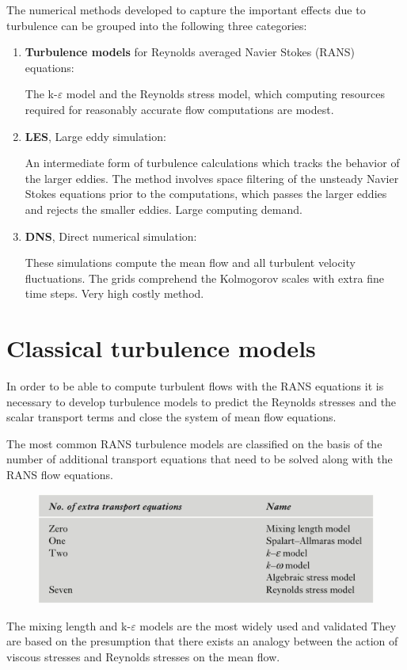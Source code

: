 \documentclass[a4paper, 15pt]{article}
\begin{document}
The
numerical methods developed to capture the important effects due to turbulence can be
grouped into the following three categories:
\begin{enumerate}
	\item \textbf{Turbulence models} for Reynolds averaged Navier Stokes (RANS) equations:
	
	The k-$\varepsilon$ model and the Reynolds stress model, which computing
	resources required for reasonably accurate flow computations are modest.
	
	\item \textbf{LES}, Large eddy simulation: 
	
	An intermediate form of turbulence calculations which tracks
	the behavior of the larger eddies. The method involves space filtering of the unsteady
	Navier Stokes equations prior to the computations, which passes the larger eddies and rejects
	the smaller eddies. 
	Large computing demand. 
	
	\item \textbf{DNS}, Direct numerical simulation:
	
	These simulations compute the mean flow and all
	turbulent velocity fluctuations. The grids comprehend the Kolmogorov scales with extra fine time steps. 	
	Very high costly method.  
\end{enumerate}

\section{Classical turbulence models}


In
order to be able to compute turbulent flows with the RANS equations it is necessary to
develop turbulence models to predict the Reynolds stresses and the scalar transport terms and
close the system of mean flow equations. \newline
 

The
most common RANS turbulence models are classified on the basis of the number of
additional transport equations that need to be solved along with the RANS flow equations.
\begin{figure}[H]
	\centering
	\includegraphics[width=0.5\linewidth]{fig/screenshot002}
	\label{fig:screenshot002}
\end{figure}
The mixing length and k-$\varepsilon$ models are the most widely used and
validated They are based on the presumption that there exists an analogy between the action of
viscous stresses and Reynolds stresses on the mean flow. \newline 
\end{document}
